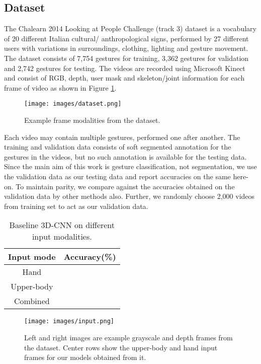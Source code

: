 \documentclass{article}
\begin{document}
\subsection{Dataset}
\label{ssec:dataset}

The Chalearn 2014 Looking at People Challenge (track 3) \cite{Escalera2015} dataset is a vocabulary of 20 different Italian cultural/ anthropological signs, performed by 27 different users with variations in surroundings, clothing, lighting and gesture movement. The dataset consists of 7,754 gestures for training, 3,362 gestures for validation and 2,742 gestures for testing. The videos are recorded using Microsoft Kinect and consist of RGB, depth, user mask and skeleton/joint information for each frame of video as shown in Figure \ref{fig:dataset}.

\begin{figure}
  \texttt{[image: images/dataset.png]}
  \caption{Example frame modalities from the dataset.}
  \label{fig:dataset}
\end{figure}

Each video may contain multiple gestures, performed one after another. The training and validation data consists of soft segmented annotation for the gestures in the videos, but no such annotation is available for the testing data. Since the main aim of this work is gesture classification, not segmentation, we use the validation data as our testing data and report accuracies on the same here-on. To maintain parity, we compare against the accuracies obtained on the validation data by other methods also. Further, we randomly choose 2,000 videos from training set to act as our validation data.

\begin{table}
  \centering 
  \begin{tabular}{| c | c |} 
  \hline
  \textbf{Input mode} & \textbf{Accuracy(\%)} \\ 
  \hline\hline
  Hand &  \\ 
  \hline
  Upper-body &  \\
  \hline
  Combined &  \\
  \hline
  \end{tabular}
  \caption{Baseline 3D-CNN on different input modalities.}
  \label{table:tab1}
\end{table}

\begin{figure}
  \texttt{[image: images/input.png]}
  \caption{Left and right images are example grayscale and depth frames from the dataset. Center rows show the upper-body and hand input frames for our 	models obtained from it.}
  \label{fig:input}
\end{figure}
\end{document}
